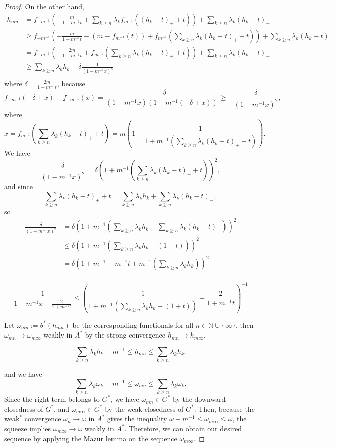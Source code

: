 \documentclass[a4paper]{amsart}
\theoremstyle{plain}
\theoremstyle{definition}
\begin{document}
\begin{proof}
On the other hand,
\begin{align*}
h_{mn}
&=f_{-m^{-1}}\left(-\frac{m}{1+m^{-1}t}+\sum_{k\ge n}\lambda_kf_{m^{-1}}((h_k-t)_++t)\right)+\sum_{k\ge n}\lambda_k(h_k-t)_-\\
&\ge f_{-m^{-1}}\left(-\frac{m}{1+m^{-1}t}-(m-f_{m^{-1}}(t))+f_{m^{-1}}\left(\sum_{k\ge n}\lambda_k(h_k-t)_++t\right)\right)+\sum_{k\ge n}\lambda_k(h_k-t)_-\\
&=f_{-m^{-1}}\left(-\frac{2m}{1+m^{-1}t}+f_{m^{-1}}\left(\sum_{k\ge n}\lambda_k(h_k-t)_++t\right)\right)+\sum_{k\ge n}\lambda_k(h_k-t)_-\\
&\ge\sum_{k\ge n}\lambda_kh_k-\delta\frac1{(1-m^{-1}x)^2}\\
\end{align*}
where $\delta=\frac{2m}{1+m^{-1}t}$, because
\[f_{-m^{-1}}(-\delta+x)-f_{-m^{-1}}(x)=\frac{-\delta}{(1-m^{-1}x)(1-m^{-1}(-\delta+x))}\ge-\frac\delta{(1-m^{-1}x)^2},\]
where
\[x=f_{m^{-1}}\left(\sum_{k\ge n}\lambda_k(h_k-t)_++t\right)=m\left(1-\frac1{1+m^{-1}\left(\sum_{k\ge n}\lambda_k(h_k-t)_++t\right)}\right).\]
We have
\[\frac\delta{(1-m^{-1}x)^2}=\delta\left(1+m^{-1}\left(\sum_{k\ge n}\lambda_k(h_k-t)_++t\right)\right)^2,\]
and since
\[\sum_{k\ge n}\lambda_k(h_k-t)_++t=\sum_{k\ge n}\lambda_kh_k+\sum_{k\ge n}\lambda_k(h_k-t)_-,\]
so
\begin{align*}
\frac\delta{(1-m^{-1}x)^2}&=\delta\left(1+m^{-1}\left(\sum_{k\ge n}\lambda_kh_k+\sum_{k\ge n}\lambda_k(h_k-t)_-\right)\right)^2\\
&\le\delta\left(1+m^{-1}\left(\sum_{k\ge n}\lambda_kh_k+(1+t)\right)\right)^2\\
&=\delta\left(1+m^{-1}+m^{-1}t+m^{-1}\left(\sum_{k\ge n}\lambda_kh_k\right)\right)^2\\
\end{align*}

\[\frac1{1-m^{-1}x+\frac2{1+m^{-1}t}}\le(\frac1{1+m^{-1}(\sum_{k\ge n}\lambda_kh_k+(1+t))}+\frac2{1+m^{-1}t})^{-1}\]


Let $\omega_{mn}:=\theta^*(h_{mn})$ be the corresponding functionals for all $n\in\mathbb{N}\cup\{\infty\}$, then $\omega_{mn}\to\omega_{m\infty}$ weakly in $A^*$ by the strong convergence $h_{mn}\to h_{m\infty}$,

\[\sum_{k\ge n}\lambda_kh_k-m^{-1}\le h_{mn}\le\sum_{k\ge n}\lambda_kh_k.\]

 and we have
\[\sum_{k\ge n}\lambda_k\omega_k-m^{-1}\le\omega_{mn}\le\sum_{k\ge n}\lambda_k\omega_k.\]
Since the right term belongs to $G^*$, we have $\omega_{mn}\in G^*$ by the downward closedness of $G^*$, and $\omega_{m\infty}\in G^*$ by the weak closedness of $G^*$.
Then, because the weak$^*$ convergence $\omega_n\to\omega$ in $A^*$ gives the inequality $\omega-m^{-1}\le\omega_{m\infty}\le\omega$, the squeeze implies $\omega_{m\infty}\to\omega$ weakly in $A^*$.
Therefore, we can obtain our desired sequence by applying the Mazur lemma on the sequence $\omega_{m\infty}$.
\end{proof}
\end{document}
